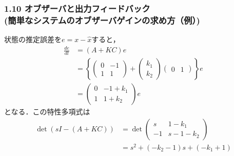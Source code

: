 \begin{frame}[t]
\frametitle{1.10 オブザーバと出力フィードバック \\
(簡単なシステムのオブザーバゲインの求め方（例）)}
状態の推定誤差を$e = x - \hat{x}$すると，
\begin{align}
 \frac{de}{dt}
 &= (A+KC) e
 \nonumber \\
 &=
 \left\{
 \left(
 \begin{array}{cc}
  0 & -1 \\
  1 & 1
 \end{array}
 \right)
 + 
 \left( 
 \begin{array}{c}
  k_1 \\
  k_2
 \end{array}
 \right)
 \left(
 \begin{array}{cc}
  0 & 1
 \end{array}
 \right)
 \right\} e
\nonumber \\
 &=
 \left(
 \begin{array}{cc}
  0 & -1 +k_1\\
  1 & 1 + k_2
 \end{array}
 \right)  e
\end{align}
となる．この特性多項式は
\begin{align}
 \det (sI-(A+KC))
 &=\det 
  \left(
  \begin{array}{cc}
   s & 1 -k_1\\
   -1 & s-1 - k_2
  \end{array}
  \right)
 \nonumber \\
 &= s^2 + (-k_2 - 1)s + (-k_1 + 1)
\end{align}
\end{frame}


